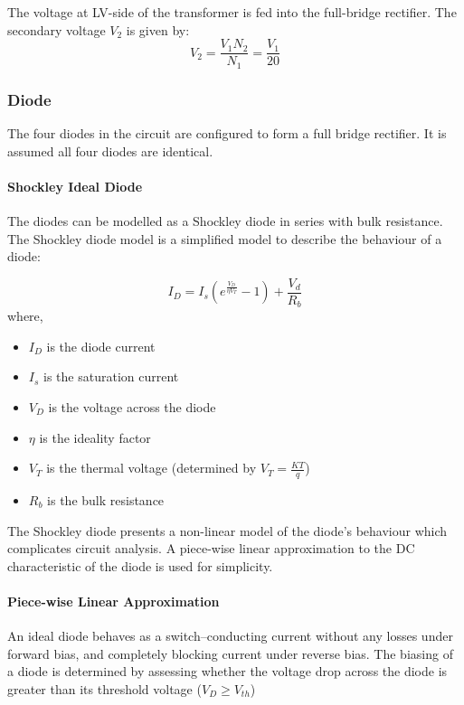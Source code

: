 The voltage at LV-side of the transformer is fed into the full-bridge rectifier. The secondary voltage $V_2$ is given by:
\begin{equation}
    V_2 = \frac{V_1N_2}{N_1} = \frac{V_1}{20}
\end{equation}

\subsubsection{Diode}
The four diodes in the circuit are configured to form a full bridge rectifier. It is assumed all four diodes are identical.

\paragraph{Shockley Ideal Diode}
The diodes can be modelled as a Shockley diode in series with bulk resistance. The Shockley diode model is a simplified model to describe the behaviour of a diode:

\begin{equation}
	I_D = I_s\left( e^{\frac{V_D}{\eta V_T}} - 1 \right) + \frac{V_d}{R_b}	\label{shockeyDiodeWithBulkResistance}
\end{equation}
where,
\begin{itemize}
	\item $I_D$ is the diode current
	\item $I_s$ is the saturation current
	\item $V_D$ is the voltage across the diode
	\item $\eta$ is the ideality factor
	\item $V_T$ is the thermal voltage (determined by $V_T = \frac{KT}{q}$)
	\item $R_b$ is the bulk resistance
\end{itemize}	

The Shockley diode presents a non-linear model of the diode's behaviour which complicates circuit analysis. A piece-wise linear approximation to the DC characteristic of the diode is used for simplicity.

\paragraph{Piece-wise Linear Approximation}
An ideal diode behaves as a switch–conducting current without any losses under forward bias, and completely blocking current under reverse bias. The biasing of a diode is determined by assessing whether the voltage drop across the diode is greater than its threshold voltage ($V_D \geq V_{th}$)

